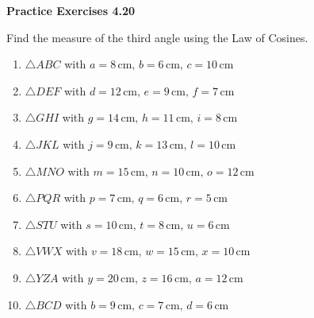 \vspace{0.3ex}
\noindent\textbf{Practice Exercises 4.20}

\vspace{0.2ex}

Find the measure of the third angle using the Law of Cosines.

\begin{enumerate}
    \item \(\triangle ABC\) with \(a = 8 \, \text{cm}, \, b = 6 \, \text{cm}, \, c = 10 \, \text{cm}\)
    \item \(\triangle DEF\) with \(d = 12 \, \text{cm}, \, e = 9 \, \text{cm}, \, f = 7 \, \text{cm}\)
    \item \(\triangle GHI\) with \(g = 14 \, \text{cm}, \, h = 11 \, \text{cm}, \, i = 8 \, \text{cm}\)
    \item \(\triangle JKL\) with \(j = 9 \, \text{cm}, \, k = 13 \, \text{cm}, \, l = 10 \, \text{cm}\)
    \item \(\triangle MNO\) with \(m = 15 \, \text{cm}, \, n = 10 \, \text{cm}, \, o = 12 \, \text{cm}\)
    \item \(\triangle PQR\) with \(p = 7 \, \text{cm}, \, q = 6 \, \text{cm}, \, r = 5 \, \text{cm}\)
    \item \(\triangle STU\) with \(s = 10 \, \text{cm}, \, t = 8 \, \text{cm}, \, u = 6 \, \text{cm}\)
    \item \(\triangle VWX\) with \(v = 18 \, \text{cm}, \, w = 15 \, \text{cm}, \, x = 10 \, \text{cm}\)
    \item \(\triangle YZA\) with \(y = 20 \, \text{cm}, \, z = 16 \, \text{cm}, \, a = 12 \, \text{cm}\)
    \item \(\triangle BCD\) with \(b = 9 \, \text{cm}, \, c = 7 \, \text{cm}, \, d = 6 \, \text{cm}\)
\end{enumerate}
